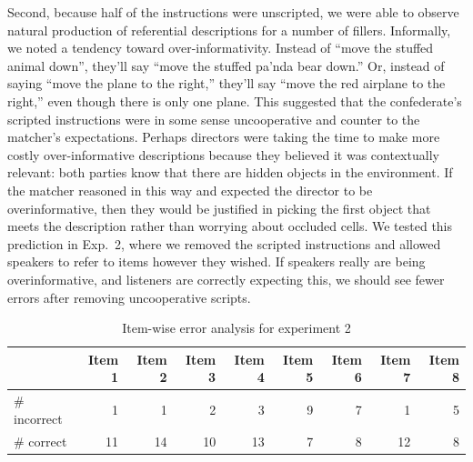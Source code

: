 \documentclass[10pt,letterpaper]{article}
\begin{document}
Second, because half of the instructions were unscripted, we were able to observe natural production of referential descriptions for a number of fillers. Informally, we noted a tendency toward over-informativity. Instead of ``move the stuffed animal down'', they'll say ``move the stuffed pa'nda bear down.'' Or, instead of saying ``move the plane to the right,'' they'll say ``move the red airplane to the right,'' even though there is only one plane. This suggested that the confederate's scripted instructions were in some sense uncooperative and counter to the matcher's expectations. Perhaps directors were taking the time to make more costly over-informative descriptions because they believed it was contextually relevant: both parties know that there are hidden objects in the environment. If the matcher reasoned in this way and expected the director to be overinformative, then they would be justified in picking the first object that meets the description rather than worrying about occluded cells. We tested this prediction in Exp.~2, where we removed the scripted instructions and allowed speakers to refer to items however they wished. If speakers really are being overinformative, and listeners are correctly expecting this, we should see fewer errors after removing uncooperative scripts.

\begin{table}
\begin{center}
\begin{tabular}{ p{2cm} | r | r |  r | r | r | r | r | r |}
& Item 1 & Item 2 & Item 3 & Item 4 & Item 5 & Item 6 & Item 7 & Item 8\\\hline
 \# incorrect & 1 & 1 & 2 & 3 & 9 & 7 & 1 & 5 \\
 \# correct   & 11&14&10&13&7 &8   &12& 8 \\
\end{tabular}
\caption{Item-wise error analysis for experiment 2}
\label{table:exp2ItemWise}
\end{center}
\end{table}
\end{document}
